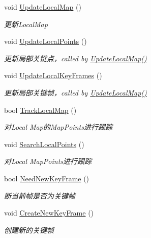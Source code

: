 \begin{DoxyCompactItemize}
\item 
void \hyperlink{classORB__SLAM2_1_1Tracking_a22723e9972c18a888dd51a82eec27b0a}{Update\-Local\-Map} ()
\begin{DoxyCompactList}\small\item\em 更新\-Local\-Map \end{DoxyCompactList}\item 
void \hyperlink{classORB__SLAM2_1_1Tracking_a25843575116bf18c065d6cc7645f5b26}{Update\-Local\-Points} ()
\begin{DoxyCompactList}\small\item\em 更新局部关键点，called by \hyperlink{classORB__SLAM2_1_1Tracking_a22723e9972c18a888dd51a82eec27b0a}{Update\-Local\-Map()} \end{DoxyCompactList}\item 
void \hyperlink{classORB__SLAM2_1_1Tracking_a42bed56bbbe8282eb77733e7168d8599}{Update\-Local\-Key\-Frames} ()
\begin{DoxyCompactList}\small\item\em 更新局部关键帧，called by \hyperlink{classORB__SLAM2_1_1Tracking_a22723e9972c18a888dd51a82eec27b0a}{Update\-Local\-Map()} \end{DoxyCompactList}\item 
bool \hyperlink{classORB__SLAM2_1_1Tracking_af670c614f4e10d58c9f7aad9865b5c08}{Track\-Local\-Map} ()
\begin{DoxyCompactList}\small\item\em 对\-Local Map的\-Map\-Points进行跟踪 \end{DoxyCompactList}\item 
void \hyperlink{classORB__SLAM2_1_1Tracking_a451c0e5372c24645c7634fcebc8fa847}{Search\-Local\-Points} ()
\begin{DoxyCompactList}\small\item\em 对\-Local Map\-Points进行跟踪 \end{DoxyCompactList}\item 
bool \hyperlink{classORB__SLAM2_1_1Tracking_afc013c5a20bc6beb772b96a875b19216}{Need\-New\-Key\-Frame} ()
\begin{DoxyCompactList}\small\item\em 断当前帧是否为关键帧 \end{DoxyCompactList}\item 
void \hyperlink{classORB__SLAM2_1_1Tracking_a8c7fb6c4b1f952524512023df690bf4d}{Create\-New\-Key\-Frame} ()
\begin{DoxyCompactList}\small\item\em 创建新的关键帧 \end{DoxyCompactList}\end{DoxyCompactItemize}
